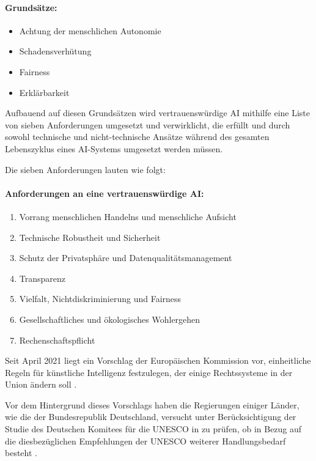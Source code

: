 \documentclass[12pt]{report}
\begin{document}
\paragraph{Grundsätze:}
\begin{itemize}
	\item  Achtung der menschlichen Autonomie
	\item  Schadensverhütung
	\item  Fairness
	\item  Erklärbarkeit
\end{itemize}

Aufbauend auf diesen Grundsätzen wird vertrauenswürdige AI mithilfe eine Liste von sieben Anforderungen umgesetzt und verwirklicht, die erfüllt und durch sowohl technische und nicht-technische Ansätze während des gesamten Lebenszyklus eines AI-Systems umgesetzt werden müssen.

Die sieben Anforderungen lauten wie folgt:

\paragraph{Anforderungen an eine vertrauenswürdige AI:}
\begin{enumerate}
	\item  Vorrang menschlichen Handelns und menschliche Aufsicht
	\item  Technische Robustheit und Sicherheit
	\item  Schutz der Privatsphäre und Datenqualitätsmanagement
	\item  Transparenz
	\item  Vielfalt, Nichtdiskriminierung und Fairness
	\item  Gesellschaftliches und ökologisches Wohlergehen
	\item  Rechenschaftspflicht
\end{enumerate}

Seit April 2021 liegt ein Vorschlag der Europäischen Kommission vor, einheitliche Regeln für künstliche Intelligenz festzulegen, der einige Rechtssysteme in der Union ändern soll \cite{GesetzesentwurfEUComm}.

Vor dem Hintergrund dieses Vorschlags haben die Regierungen einiger Länder, wie die der Bundesrepublik Deutschland, versucht unter Berücksichtigung der Studie des Deutschen Komitees für die UNESCO in \cite[UNESCO-Empfehlung zur Ethik Künstlicher Intelligenz. Bedingungen zur Implementierung in Deutschland]{Kettemann} zu prüfen, ob in Bezug auf die diesbezüglichen Empfehlungen der UNESCO weiterer Handlungsbedarf besteht \cite{Deutscher_Bundestag}.  
\end{document}
